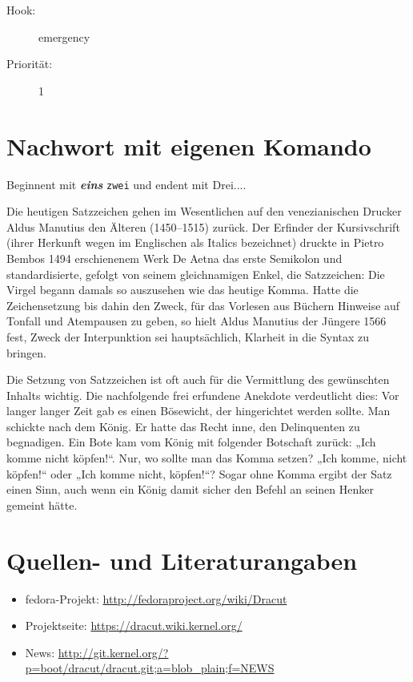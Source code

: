 \documentclass[10pt,a4paper]{article}
\newcommand{\doppelt}[2]{\textit{\textbf{#1}} \texttt{#2}}
\begin{document}
\begin{description}
\item[Hook:] emergency
\item[Priorität:] 1
\end{description}

\section{Nachwort mit eigenen Komando}

Beginnent mit \doppelt{eins}{zwei} und endent mit Drei....

Die heutigen Satzzeichen gehen im Wesentlichen auf den venezianischen Drucker
Aldus Manutius den Älteren (1450–1515) zurück. Der Erfinder der Kursivschrift
(ihrer Herkunft wegen im Englischen als Italics bezeichnet) druckte in Pietro
Bembos 1494 erschienenem Werk De Aetna das erste Semikolon und standardisierte,
gefolgt von seinem gleichnamigen Enkel, die Satzzeichen: Die Virgel begann
damals so auszusehen wie das heutige Komma. Hatte die Zeichensetzung bis dahin
den Zweck, für das Vorlesen aus Büchern Hinweise auf Tonfall und Atempausen zu
geben, so hielt Aldus Manutius der Jüngere 1566 fest, Zweck der Interpunktion
sei hauptsächlich, Klarheit in die Syntax zu bringen.


Die Setzung von Satzzeichen ist oft auch für die Vermittlung des gewünschten
Inhalts wichtig. Die nachfolgende frei erfundene Anekdote verdeutlicht dies:
Vor langer langer Zeit gab es einen Bösewicht, der hingerichtet werden sollte.
Man schickte nach dem König. Er hatte das Recht inne, den Delinquenten zu
begnadigen. Ein Bote kam vom König mit folgender Botschaft zurück: „Ich
komme nicht köpfen!“. Nur, wo sollte man das Komma setzen? „Ich komme, nicht
köpfen!“ oder „Ich komme nicht, köpfen!“? Sogar ohne Komma ergibt der Satz
einen Sinn, auch wenn ein König damit sicher den Befehl an seinen Henker
gemeint hätte.


\section{Quellen- und Literaturangaben}
\label{sec:quell}

\begin{itemize}
 \item fedora-Projekt: \url{http://fedoraproject.org/wiki/Dracut}
 \item Projektseite: \url{https://dracut.wiki.kernel.org/}
 \item News: \url{http://git.kernel.org/?p=boot/dracut/dracut.git;a=blob_plain;f=NEWS}
\end{itemize}


\end{document}
